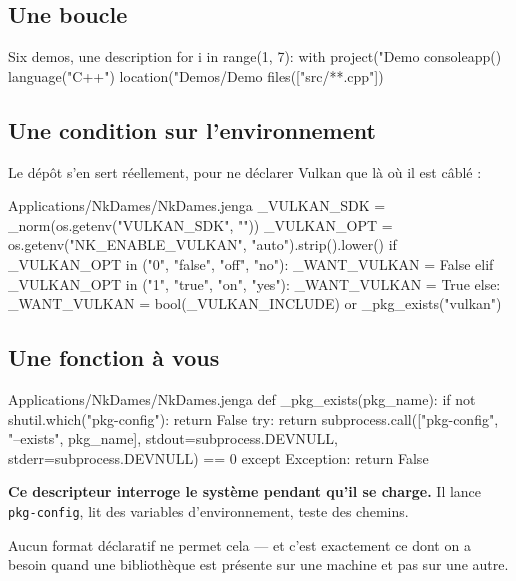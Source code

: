\subsection{Une boucle}

\begin{nkcode}{Six demos, une description}
for i in range(1, 7):
    with project("Demo%
        consoleapp()
        language("C++")
        location("Demos/Demo%
        files(["src/**.cpp"])
\end{nkcode}

\subsection{Une condition sur l'environnement}

Le dépôt s'en sert réellement, pour ne déclarer Vulkan que là où il est câblé :

\begin{nkcode}{Applications/NkDames/NkDames.jenga}
_VULKAN_SDK = _norm(os.getenv("VULKAN_SDK", ""))
_VULKAN_OPT = os.getenv("NK_ENABLE_VULKAN", "auto").strip().lower()
if _VULKAN_OPT in ("0", "false", "off", "no"):
    _WANT_VULKAN = False
elif _VULKAN_OPT in ("1", "true", "on", "yes"):
    _WANT_VULKAN = True
else:
    _WANT_VULKAN = bool(_VULKAN_INCLUDE) or _pkg_exists("vulkan")
\end{nkcode}

\subsection{Une fonction à vous}

\begin{nkcode}{Applications/NkDames/NkDames.jenga}
def _pkg_exists(pkg_name):
    if not shutil.which("pkg-config"):
        return False
    try:
        return subprocess.call(["pkg-config", "--exists", pkg_name],
                               stdout=subprocess.DEVNULL,
                               stderr=subprocess.DEVNULL) == 0
    except Exception:
        return False
\end{nkcode}

\begin{nkretenir}
\textbf{Ce descripteur interroge le système pendant qu'il se charge.} Il lance
\texttt{pkg-config}, lit des variables d'environnement, teste des chemins.

Aucun format déclaratif ne permet cela --- et c'est exactement ce dont on a
besoin quand une bibliothèque est présente sur une machine et pas sur une autre.
\end{nkretenir}

